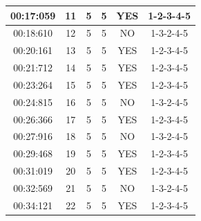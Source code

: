 \documentclass[12pt,a4paper,twoside]{book}
\begin{document}
\begin{table}[H]
{\begin{tabular}{|c|c|c|c|c|c|}
            00:17:059      & 11                            & 5                            & 5                              & YES               & 1-2-3-4-5                 \\ \hline
            00:18:610      & 12                            & 5                            & 5                              & NO                & 1-3-2-4-5                 \\ \hline
            00:20:161      & 13                            & 5                            & 5                              & YES               & 1-2-3-4-5                 \\ \hline
            00:21:712      & 14                            & 5                            & 5                              & YES               & 1-2-3-4-5                 \\ \hline
            00:23:264      & 15                            & 5                            & 5                              & YES               & 1-2-3-4-5                 \\ \hline
            00:24:815      & 16                            & 5                            & 5                              & NO                & 1-3-2-4-5                 \\ \hline
            00:26:366      & 17                            & 5                            & 5                              & YES               & 1-2-3-4-5                 \\ \hline
            00:27:916      & 18                            & 5                            & 5                              & NO                & 1-3-2-4-5                 \\ \hline
            00:29:468      & 19                            & 5                            & 5                              & YES               & 1-2-3-4-5                 \\ \hline
            00:31:019      & 20                            & 5                            & 5                              & YES               & 1-2-3-4-5                 \\ \hline
            00:32:569      & 21                            & 5                            & 5                              & NO                & 1-3-2-4-5                 \\ \hline
            00:34:121      & 22                            & 5                            & 5                              & YES               & 1-2-3-4-5                 \\ \hline

\end{tabular}}
\end{table}
\end{document}
